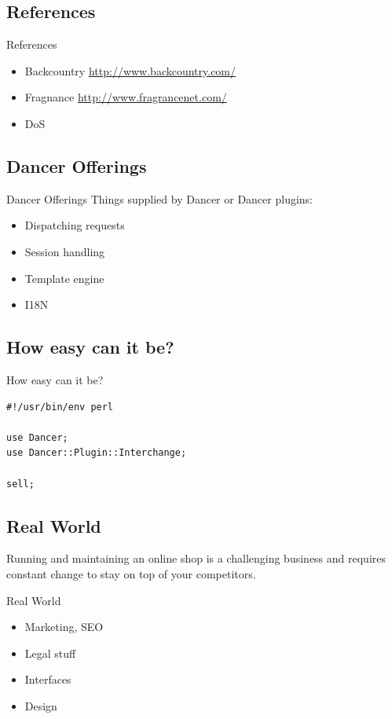 \subsection{References}
\begin{frame}{References}
\begin{itemize}
\item Backcountry \url{http://www.backcountry.com/}
\item Fragnance \url{http://www.fragrancenet.com/}
\item DoS
\end{itemize}
\end{frame}

\subsection{Dancer Offerings}
\begin{frame}{Dancer Offerings}
Things supplied by Dancer or Dancer plugins:

\begin{itemize}
\item Dispatching requests
\item Session handling
\item Template engine
\item I18N
\end{itemize}
\end{frame}

\subsection{How easy can it be?}
\begin{frame}[fragile]{How easy can it be?}
\begin{lstlisting}
#!/usr/bin/env perl

use Dancer;
use Dancer::Plugin::Interchange;

sell;
\end{lstlisting}
\end{frame}

\subsection{Real World}
Running and maintaining an online shop is a challenging business
and requires constant change to stay on top of your competitors.

\begin{frame}{Real World}
\begin{itemize}
\item Marketing, SEO
\item Legal stuff
\item Interfaces
\item Design
\end{itemize}
\end{frame}


